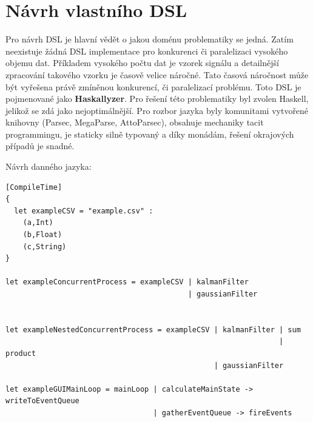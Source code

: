 \documentclass[male,czech]{kithesis}
\begin{document}
{\centering
{}
}

\chapter{Návrh vlastního DSL}
Pro návrh DSL je hlavní vědět o jakou doménu problematiky se jedná. Zatím neexistuje žádná DSL implementace pro konkurenci či paralelizaci vysokého objemu dat.
Příkladem vysokého počtu dat je vzorek signálu a detailnější zpracování takového vzorku je časově velice náročné. Tato časová náročnost může být vyřešena právě zmíněnou
konkurencí, či paralelizací problému. Toto DSL je pojmenované jako \textbf{Haskallyzer}.
Pro řešení této problematiky byl zvolen Haskell, jelikož se zdá jako nejoptimálnější. Pro rozbor jazyka byly komunitami vytvořené knihovny (Parsec, MegaParse, AttoParsec),
obsahuje mechaniky tacit programmingu, je staticky silně typovaný a díky monádám, řešení okrajových případů je snadné.

Návrh danného jazyka:

\begin{verbatim}
[CompileTime]
{
  let exampleCSV = "example.csv" :
    (a,Int)
    (b,Float)
    (c,String)
}

let exampleConcurrentProcess = exampleCSV | kalmanFilter 
                                          | gaussianFilter 
                                      

let exampleNestedConcurrentProcess = exampleCSV | kalmanFilter | sum
                                                               | product
                                                | gaussianFilter

let exampleGUIMainLoop = mainLoop | calculateMainState -> writeToEventQueue
                                  | gatherEventQueue -> fireEvents
\end{verbatim}
\end{document}
